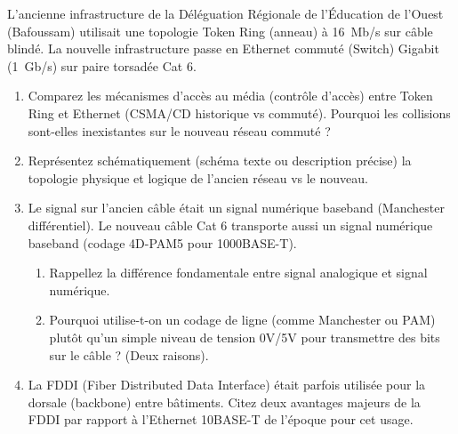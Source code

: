 \documentclass[11pt]{article}
\begin{document}
\begin{exercice}
L'ancienne infrastructure de la Déléguation Régionale de l'Éducation de l'Ouest (Bafoussam) utilisait une topologie Token Ring (anneau) à \SI{16}{Mb/s} sur câble blindé. La nouvelle infrastructure passe en Ethernet commuté (Switch) Gigabit (\SI{1}{Gb/s}) sur paire torsadée Cat 6.

\begin{enumerate}
    \item Comparez les mécanismes d'accès au média (contrôle d'accès) entre Token Ring et Ethernet (CSMA/CD historique vs commuté). Pourquoi les collisions sont-elles inexistantes sur le nouveau réseau commuté ?
    \item Représentez schématiquement (schéma texte ou description précise) la topologie physique et logique de l'ancien réseau vs le nouveau.
    \item Le signal sur l'ancien câble était un signal numérique baseband (Manchester différentiel). Le nouveau câble Cat 6 transporte aussi un signal numérique baseband (codage 4D-PAM5 pour 1000BASE-T).
    \begin{enumerate}
        \item Rappellez la différence fondamentale entre signal analogique et signal numérique.
        \item Pourquoi utilise-t-on un codage de ligne (comme Manchester ou PAM) plutôt qu'un simple niveau de tension 0V/5V pour transmettre des bits sur le câble ? (Deux raisons).
    \end{enumerate}
    \item La FDDI (Fiber Distributed Data Interface) était parfois utilisée pour la dorsale (backbone) entre bâtiments. Citez deux avantages majeurs de la FDDI par rapport à l'Ethernet 10BASE-T de l'époque pour cet usage.
\end{enumerate}
\end{exercice}
\end{document}
